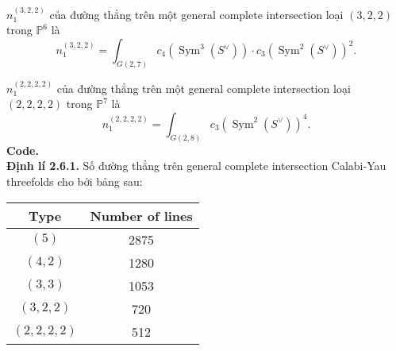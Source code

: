 \documentclass[11pt,a4paper]{book}
\begin{document}
$n_1^{(3,2,2)}$ của đường thẳng trên một general complete intersection loại $(3,2,2)$ trong $\mathbb{P}^6$ là
$$
n_1^{(3,2,2)}=\int_{G(2,7)} c_4\left(\operatorname{Sym}^3\left(S^{\vee}\right)\right) \cdot c_3\left(\operatorname{Sym}^2\left(S^{\vee}\right)\right)^2 .
$$

$n_1^{(2,2,2,2)}$ của đường thẳng trên một general complete intersection loại $(2,2,2,2)$ trong $\mathbb{P}^7$ là
$$
n_1^{(2,2,2,2)}=\int_{G(2,8)} c_3\left(\operatorname{Sym}^2\left(S^{\vee}\right)\right)^4 .
$$
\textbf{Code.}\\
\textbf{Định lí 2.6.1.} Số đường thẳng trên general complete intersection Calabi-Yau threefolds cho bởi bảng sau:
\begin{center}
	\begin{tabular}{|c|c|}
		\hline Type & Number of lines \\
		\hline$(5)$ & 2875 \\
		$(4,2)$ & 1280 \\
		$(3,3)$ & 1053 \\
		$(3,2,2)$ & 720 \\
		$(2,2,2,2)$ & 512 \\
		\hline
	\end{tabular}
\end{center}
\end{document}
